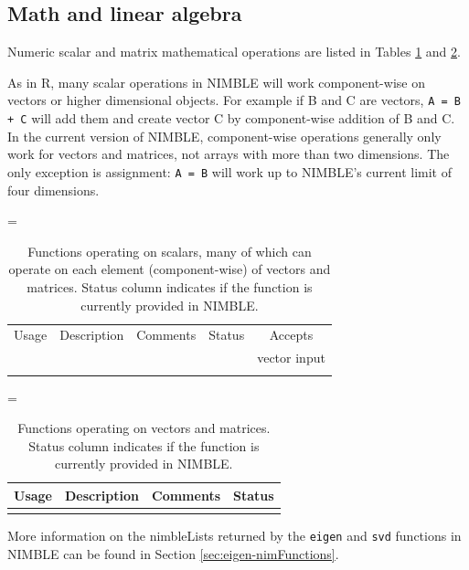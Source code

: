 \documentclass[12pt,oneside]{book}\usepackage[]{graphicx}\usepackage[]{color}
\def\cd#1{\texttt{#1}}
\begin{document}
\subsection{Math and linear algebra}
\label{sec:basic-math-linear}

Numeric scalar and matrix mathematical operations are listed in Tables
\ref{table:functions-dsl} and \ref{table:functions-matrix-dsl}.  

As in R, many scalar operations in NIMBLE will work component-wise on vectors or
higher dimensional objects.  For example if B and C are vectors, \cd{A
  = B + C} will add them and create vector C by component-wise
addition of B and C.  In the current version of NIMBLE, component-wise operations
generally only work for vectors and matrices, not arrays with more
than two dimensions.  The only exception is assignment: \cd{A = B} will
work up to NIMBLE's current limit of four dimensions.

{
\footnotesize 
\LTcapwidth=\textwidth
\begin{longtable}[c]{lllcc}
 \caption{Functions operating on scalars, many of which can operate on
   each element (component-wise) of vectors and matrices. Status
   column indicates if the function is currently provided in
   NIMBLE.}    \label{table:functions-dsl}\\
\hline
 Usage & Description & Comments & Status & Accepts \\
   &  &  &  & vector input  \\
  \hline \hline \\
\endhead

\end{longtable}
}


{
\footnotesize
\LTcapwidth=\textwidth

\begin{longtable}[c]{lllc}
 \caption{Functions operating on vectors and matrices. Status column
  indicates if the function is currently provided in
  NIMBLE.} \label{table:functions-matrix-dsl} \\
  \hline
  Usage & Description & Comments & Status   \\
  \hline \hline \\
\endhead


 \end{longtable}
}

More information on the nimbleLists returned by the \cd{eigen} and \cd{svd} functions in NIMBLE can be found in Section \ref{sec:eigen-nimFunctions}.
\end{document}
